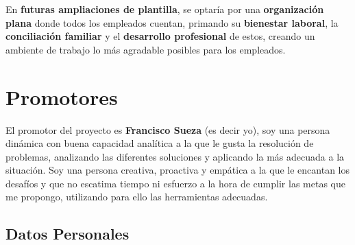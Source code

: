 En \textbf{futuras ampliaciones de plantilla}, se optaría por una \textbf{organización plana} donde todos los empleados cuentan, primando su \textbf{bienestar laboral}, la \textbf{conciliación familiar} y el \textbf{desarrollo profesional} de estos, creando un ambiente de trabajo lo más agradable posibles para los empleados.

\section{Promotores}
El promotor del proyecto es \textbf{Francisco Sueza} (es decir yo), soy una persona dinámica con buena capacidad analítica a la que le gusta la resolución de problemas, analizando las diferentes soluciones y aplicando la más adecuada a la situación. Soy una persona creativa, proactiva y empática a la que le encantan los desafíos y que no escatima tiempo ni esfuerzo a la hora de cumplir las metas que me propongo, utilizando para ello las herramientas adecuadas.

\subsection{Datos Personales}

